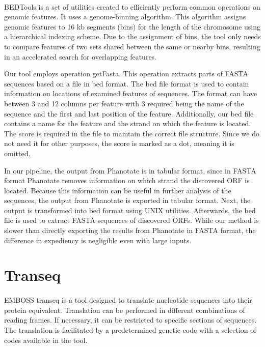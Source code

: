 \paragraph*{}
BEDTools\cite{quinlan2010bedtools} is a set of utilities created to efficiently perform common operations on genomic features. It uses a genome-binning algorithm. This algorithm assigns genomic features to 16 kb segments (bins) for the length of the chromosome using a hierarchical indexing scheme. Due to the assignment of bins, the tool only needs to compare features of two sets shared between the same or nearby bins, resulting in an accelerated search for overlapping features.

Our tool employs operation getFasta. This operation extracts parts of FASTA sequences based on a file in bed format. The bed file format is used to contain information on locations of examined features of sequences. The format can have between 3 and 12 columns per feature with 3 required being the name of the sequence and the first and last position of the feature. Additionally, our bed file contains a name for the feature and the strand on which the feature is located. The score is required in the file to maintain the correct file structure. Since we do not need it for other purposes, the score is marked as a dot, meaning it is omitted.

In our pipeline, the output from Phanotate is in tabular format, since in FASTA format Phanotate removes information on which strand the discovered ORF is located. Because this information can be useful in further analysis of the sequences, the output from Phanotate is exported in tabular format. Next, the output is transformed into bed format using UNIX utilities. Afterwards, the bed file is used to extract FASTA sequences of discovered ORFs. While our method is slower than directly exporting the results from Phanotate in FASTA format, the difference in expediency is negligible even with large inputs.

\section{Transeq}
\paragraph*{}
EMBOSS transeq\cite{madeira2022search} is a tool designed to translate nucleotide sequences into their protein equivalent. Translation can be performed in different combinations of reading frames. If necessary, it can be restricted to specific sections of sequences. The translation is facilitated by a predetermined genetic code with a selection of codes available in the tool.

